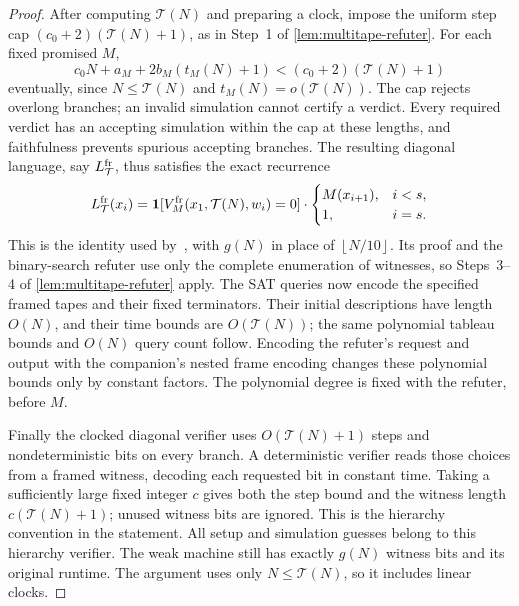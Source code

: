 \documentclass[11pt,letterpaper]{article}
\theoremstyle{definition}
\theoremstyle{remark}
\newcommand{\ind}{\mathbf 1}
\newcommand{\floor}[1]{\left\lfloor #1\right\rfloor}
\newcommand{\Tclk}{\mathcal T}
\begin{document}
\begin{proof}
After computing \(\Tclk(N)\) and preparing a clock, impose the
uniform step cap \((c_0+2)(\Tclk(N)+1)\), as in Step~1 of
\cref{lem:multitape-refuter}. For each fixed promised \(M\),
\[
 c_0N+a_M+2b_M(t_M(N)+1)
 <(c_0+2)(\Tclk(N)+1)
\]
eventually, since \(N\le\Tclk(N)\) and
\(t_M(N)=o(\Tclk(N))\). The cap rejects overlong branches; an
invalid simulation cannot certify a verdict. Every required verdict
has an accepting simulation within the cap at these lengths, and
faithfulness prevents spurious accepting branches.
The resulting diagonal language, say \(L^{\rm fr}_{\Tclk}\), thus
satisfies the exact recurrence
\[
 L^{\rm fr}_{\Tclk}(x_i)=
 \ind[V_M^{\rm fr}(x_1,\Tclk(N),w_i)=0]\cdot
 \begin{cases}
 M(x_{i+1}),&i<s,\\
 1,&i=s.
 \end{cases}
\]
This is the identity used by~\cite[Lemma~4.3 and Theorem~4.6]{CLW20},
with \(g(N)\) in place of \(\floor{N/10}\). Its proof and the
binary-search refuter use only the complete enumeration of witnesses,
so Steps~3--4 of \cref{lem:multitape-refuter} apply. The SAT queries
now encode the specified framed tapes and their fixed terminators.
Their initial descriptions have length \(O(N)\), and their time
bounds are \(O(\Tclk(N))\); the same polynomial tableau bounds and
\(O(N)\) query count follow. Encoding the refuter's request and output
with the companion's nested frame encoding changes these polynomial bounds
only by constant factors. The polynomial degree is fixed with the
refuter, before \(M\).

Finally the clocked diagonal verifier uses \(O(\Tclk(N)+1)\) steps
and nondeterministic bits on every branch. A deterministic verifier
reads those choices from a framed witness, decoding each requested bit
in constant time. Taking a sufficiently large fixed integer \(c\)
gives both the step bound and the witness length
\(c(\Tclk(N)+1)\); unused witness bits are ignored. This is the
hierarchy convention in the statement. All setup and simulation
guesses belong to this hierarchy verifier. The weak machine still has
exactly \(g(N)\) witness bits and its original runtime. The argument
uses only \(N\le\Tclk(N)\), so it includes linear clocks.
\end{proof}
\end{document}
